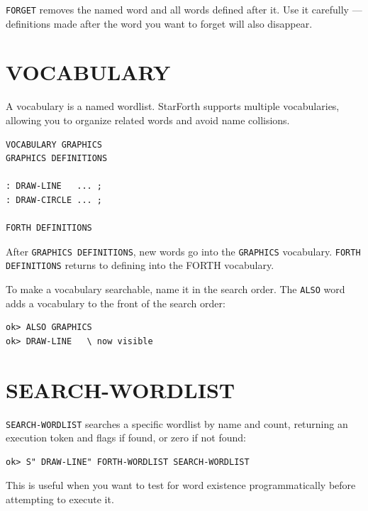 \texttt{FORGET} removes the named word and all words defined after it. Use it
carefully --- definitions made after the word you want to forget will also
disappear.

\section{VOCABULARY}
\label{sec:vocabulary}

A vocabulary is a named wordlist. StarForth supports multiple vocabularies,
allowing you to organize related words and avoid name collisions.

\begin{lstlisting}[language=Forth]
VOCABULARY GRAPHICS
GRAPHICS DEFINITIONS

: DRAW-LINE   ... ;
: DRAW-CIRCLE ... ;

FORTH DEFINITIONS
\end{lstlisting}

After \texttt{GRAPHICS DEFINITIONS}, new words go into the \texttt{GRAPHICS}
vocabulary. \texttt{FORTH DEFINITIONS} returns to defining into the FORTH
vocabulary.

To make a vocabulary searchable, name it in the search order. The
\texttt{ALSO} word adds a vocabulary to the front of the search order:

\begin{lstlisting}[language=Forth]
ok> ALSO GRAPHICS
ok> DRAW-LINE   \ now visible
\end{lstlisting}

\section{SEARCH-WORDLIST}
\label{sec:search-wordlist}

\texttt{SEARCH-WORDLIST} searches a specific wordlist by name and count,
returning an execution token and flags if found, or zero if not found:

\begin{lstlisting}[language=Forth]
ok> S" DRAW-LINE" FORTH-WORDLIST SEARCH-WORDLIST
\end{lstlisting}

This is useful when you want to test for word existence programmatically
before attempting to execute it.

